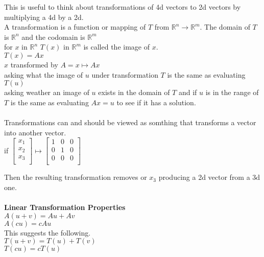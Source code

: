 \documentclass[14pt]{extreport}
\begin{document}
This is useful to think about transformations of 4d vectors to 2d vectors by multiplying a 4d by a 2d.\\

A transformation is a function or mapping of $T$ from $\mathbb{R}^n \to \mathbb{R}^m$. The domain of $T$ is $\mathbb{R}^n$ and the codomain is $\mathbb{R}^m$\\

for $x$ in $\mathbb{R}^n$ $T(x)$ in $\mathbb{R}^m$ is called the image of $x$.\\


$T(x) = Ax$\\
$x$ transformed by $A=x\mapsto Ax$\\

asking what the image of $u$ under transformation $T$ is the same as evaluating $T(u)$\\

asking weather an image of $u$ exists in the domain of $T$ and if $u$ is in the range of $T$ is the same as evaluating $Ax=u$ to see if it has a solution.\\\\

Transformations can and should be viewed as somthing that transforms a vector into another vector.\\

if $\begin{bmatrix} x_1\\ x_2\\ x_3\\ \end{bmatrix} \mapsto \begin{bmatrix}
1 & 0 & 0\\
0 & 1 & 0\\
0 & 0 & 0\\ 
\end{bmatrix}$

Then the resulting transformation removes or $x_3$ producing a 2d vector from a 3d one.\\\\

\textbf{Linear Transformation Properties}\\

$A(u+v) = Au + Av$\\
$A(cu) = cAu$\\

This suggests the following.\\

$T(u+v) = T(u) + T(v)$\\
$T(cu) = cT(u)$\\
\end{document}
